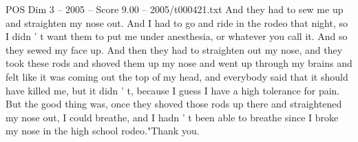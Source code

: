 \begin{textsample}{POS Dim 3 – 2005 – Score 9.00 – 2005/t000421.txt}
And they had to sew me up and straighten my nose out.
And I had to go and ride in the rodeo that night, so I didn ' t want them to put me under anesthesia, or whatever you call it.
And so they sewed my face up.
And then they had to straighten out my nose, and they took these rods and shoved them up my nose and went up through my brains and felt like it was coming out the top of my head, and everybody said that it should have killed me, but it didn ' t, because I guess I have a high tolerance for pain.
But the good thing was, once they shoved those rods up there and straightened my nose out, I could breathe, and I hadn ' t been able to breathe since I broke my nose in the high school rodeo."Thank you.

\end{textsample}
